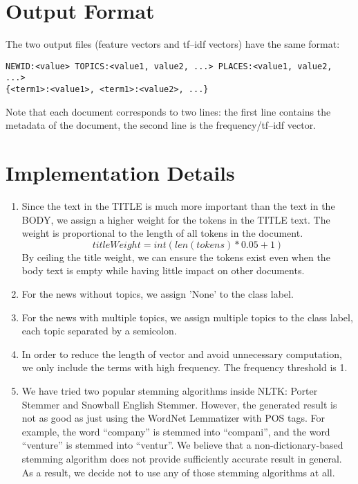 \documentclass{article}
\begin{document}
\section{Output Format}
The two output files (feature vectors and tf--idf vectors) have the same format:
\begin{verbatim}
NEWID:<value> TOPICS:<value1, value2, ...> PLACES:<value1, value2, ...>
{<term1>:<value1>, <term1>:<value2>, ...}
\end{verbatim}
\noindent
Note that each document corresponds to two lines: the first line contains the
metadata of the document, the second line is the frequency/tf--idf vector.

\section{Implementation Details}
\begin{enumerate}
  \item  Since the text in the TITLE is much more important than the text in the
  BODY, we assign a higher weight for the tokens in the TITLE text.
  The weight is proportional to the length of all tokens in the document.
\begin{equation}
titleWeight = int(len(tokens) * 0.05 + 1)
\end{equation}
By ceiling the title weight, we can ensure the tokens exist even when the body
text is empty while having little impact on other documents.
  \item  For the news without topics, we assign 'None' to the class label.
  \item  For the news with multiple topics, we assign multiple topics to the
  class label, each topic separated by a semicolon.
  \item  In order to reduce the length of vector and avoid unnecessary
  computation, we only include the terms with high frequency. The
  frequency threshold is 1.
  \item  We have tried two popular stemming algorithms inside NLTK: Porter
  Stemmer and Snowball English Stemmer. However, the generated result is not as good as just
using the WordNet Lemmatizer with POS tags. For example, the word ``company'' is
stemmed into ``compani'', and the word ``venture'' is stemmed into ``ventur''. We
believe that a non-dictionary-based stemming algorithm does not provide
sufficiently accurate result in general. As a result, we decide not to use any
of those stemming algorithms at all.

\end{enumerate}
\end{document}
